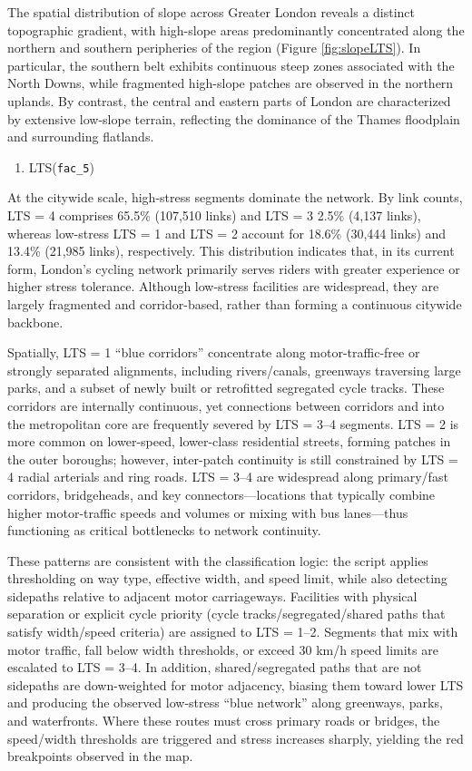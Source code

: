 \documentclass[
  12pt,
  oneside]{book}
\providecommand{\tightlist}{%
  \setlength{\itemsep}{0pt}\setlength{\parskip}{0pt}}
\begin{document}
The spatial distribution of slope across Greater London reveals a distinct topographic gradient, with high-slope areas predominantly concentrated along the northern and southern peripheries of the region (Figure \ref{fig:slopeLTS}). In particular, the southern belt exhibits continuous steep zones associated with the North Downs, while fragmented high-slope patches are observed in the northern uplands. By contrast, the central and eastern parts of London are characterized by extensive low-slope terrain, reflecting the dominance of the Thames floodplain and surrounding flatlands.

\begin{enumerate}
\def\labelenumi{\arabic{enumi}.}
\setcounter{enumi}{1}
\tightlist
\item
  LTS(\texttt{fac\_5})
\end{enumerate}

At the citywide scale, high-stress segments dominate the network. By link counts, LTS = 4 comprises 65.5\% (107,510 links) and LTS = 3 2.5\% (4,137 links), whereas low-stress LTS = 1 and LTS = 2 account for 18.6\% (30,444 links) and 13.4\% (21,985 links), respectively. This distribution indicates that, in its current form, London's cycling network primarily serves riders with greater experience or higher stress tolerance. Although low-stress facilities are widespread, they are largely fragmented and corridor-based, rather than forming a continuous citywide backbone.

Spatially, LTS = 1 ``blue corridors'' concentrate along motor-traffic-free or strongly separated alignments, including rivers/canals, greenways traversing large parks, and a subset of newly built or retrofitted segregated cycle tracks. These corridors are internally continuous, yet connections between corridors and into the metropolitan core are frequently severed by LTS = 3--4 segments. LTS = 2 is more common on lower-speed, lower-class residential streets, forming patches in the outer boroughs; however, inter-patch continuity is still constrained by LTS = 4 radial arterials and ring roads. LTS = 3--4 are widespread along primary/fast corridors, bridgeheads, and key connectors---locations that typically combine higher motor-traffic speeds and volumes or mixing with bus lanes---thus functioning as critical bottlenecks to network continuity.

These patterns are consistent with the classification logic: the script applies thresholding on way type, effective width, and speed limit, while also detecting sidepaths relative to adjacent motor carriageways. Facilities with physical separation or explicit cycle priority (cycle tracks/segregated/shared paths that satisfy width/speed criteria) are assigned to LTS = 1--2. Segments that mix with motor traffic, fall below width thresholds, or exceed 30 km/h speed limits are escalated to LTS = 3--4. In addition, shared/segregated paths that are not sidepaths are down-weighted for motor adjacency, biasing them toward lower LTS and producing the observed low-stress ``blue network'' along greenways, parks, and waterfronts. Where these routes must cross primary roads or bridges, the speed/width thresholds are triggered and stress increases sharply, yielding the red breakpoints observed in the map.
\end{document}
